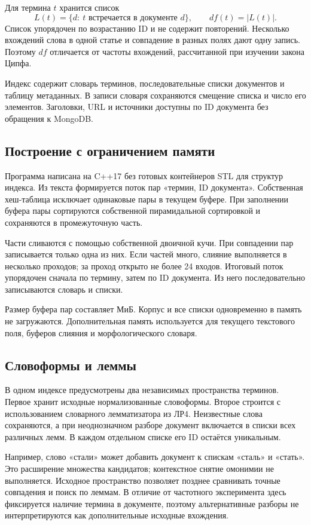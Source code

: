 \documentclass[12pt,a4paper]{article}
\begin{document}
Для термина $t$ хранится список
\[
L(t)=\{d:\ t\text{ встречается в документе }d\},\qquad
df(t)=|L(t)|.
\]
Список упорядочен по возрастанию ID и не содержит повторений.
Несколько вхождений слова в одной статье и совпадение в разных полях
дают одну запись. Поэтому $df$ отличается от частоты вхождений,
рассчитанной при изучении закона Ципфа.

Индекс содержит словарь терминов, последовательные списки документов
и таблицу метаданных. В записи словаря сохраняются смещение списка
и число его элементов. Заголовки, URL и источники доступны по ID
документа без обращения к MongoDB.

\subsection{Построение с ограничением памяти}
Программа написана на C++17 без готовых контейнеров STL для структур
индекса. Из текста формируется поток пар «термин, ID документа».
Собственная хеш-таблица исключает одинаковые пары в текущем буфере.
При заполнении буфера пары сортируются собственной пирамидальной
сортировкой и сохраняются в промежуточную часть.

Части сливаются с помощью собственной двоичной кучи. При совпадении
пар записывается только одна из них. Если частей много, слияние
выполняется в несколько проходов; за проход открыто не более 24 входов.
Итоговый поток упорядочен сначала по термину, затем по ID документа.
Из него последовательно записываются словарь и списки.

Размер буфера пар составляет \IndexBuffer{} МиБ. Корпус и все списки
одновременно в память не загружаются. Дополнительная память используется
для текущего текстового поля, буферов слияния и морфологического словаря.

\subsection{Словоформы и леммы}
В одном индексе предусмотрены два независимых пространства терминов.
Первое хранит исходные нормализованные словоформы. Второе строится
с использованием словарного лемматизатора из ЛР4.
Неизвестные слова сохраняются, а при неоднозначном разборе документ
включается в списки всех различных лемм. В каждом отдельном списке
его ID остаётся уникальным.

Например, слово «стали» может добавить документ к спискам «сталь»
и «стать». Это расширение множества кандидатов; контекстное снятие
омонимии не выполняется. Исходное пространство позволяет позднее
сравнивать точные совпадения и поиск по леммам.
В отличие от частотного эксперимента здесь фиксируется наличие
термина в документе, поэтому альтернативные разборы не интерпретируются
как дополнительные исходные вхождения.
\end{document}
